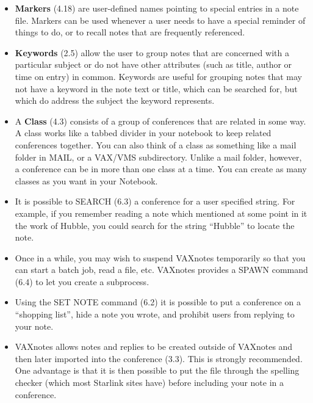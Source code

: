 \begin{itemize}

\item {\bf Markers} (4.18) are user-defined names pointing to special
entries in a note file. Markers can be used whenever a user needs to have a
special reminder of things to do, or to recall notes that are frequently
referenced.

\item {\bf Keywords} (2.5) allow the user to group notes that are concerned
with a particular subject or do not have other attributes (such as title,
author or time on entry) in common. Keywords are useful for grouping notes
that may not have a keyword in the note text or title, which can be searched
for, but which do address the subject the keyword represents.

\item A {\bf Class} (4.3) consists of a group of conferences that are related
in some way. A class works like a tabbed divider in your notebook to keep
related conferences together. You can also think of a class as something like a
mail folder in MAIL, or a VAX/VMS subdirectory.  Unlike a mail folder, however,
a conference can be in more than one class at a time.  You can create as many
classes as you want in your Notebook.

\item It is possible to SEARCH (6.3) a conference for a user specified
string. For example, if you remember reading a note which mentioned
at some point in it the work of Hubble, you could search for the
string ``Hubble'' to locate the note.

\item Once in a while, you may wish to suspend VAXnotes temporarily
so that you can start a batch job, read a file, etc. VAXnotes
provides a SPAWN command (6.4) to let you create a subprocess.

\item Using the SET NOTE command (6.2) it is possible to put a conference
on a ``shopping list'', hide a note you wrote, and prohibit users from
replying to your note.

\item VAXnotes allows notes and replies to be created outside of VAXnotes
and then later imported into the conference (3.3). This is strongly recommended.
One advantage is that it is then possible to put the file through the spelling checker
(which most Starlink sites have) before including your note in a conference.


\end{itemize}
